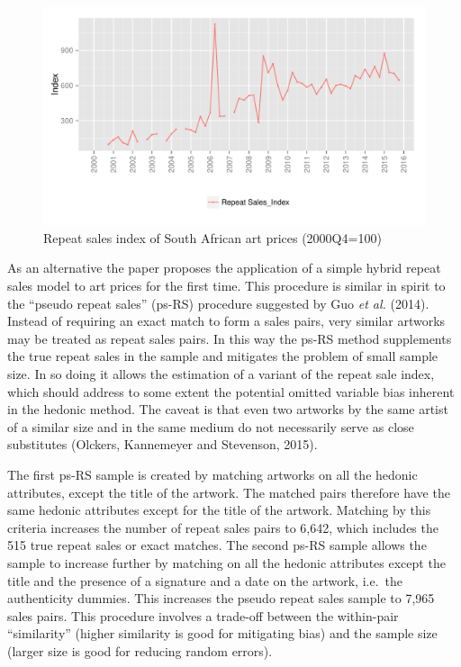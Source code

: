 \documentclass[12pt,]{article}
\begin{document}
\begin{figure}[htbp]
\centering
\includegraphics{Art_Price_Indices_3_files/figure-latex/figure8-1.pdf}
\caption{Repeat sales index of South African art prices (2000Q4=100)}
\end{figure}

As an alternative the paper proposes the application of a simple hybrid
repeat sales model to art prices for the first time. This procedure is
similar in spirit to the ``pseudo repeat sales'' (ps-RS) procedure
suggested by Guo \emph{et al.} (2014). Instead of requiring an exact
match to form a sales pairs, very similar artworks may be treated as
repeat sales pairs. In this way the ps-RS method supplements the true
repeat sales in the sample and mitigates the problem of small sample
size. In so doing it allows the estimation of a variant of the repeat
sale index, which should address to some extent the potential omitted
variable bias inherent in the hedonic method. The caveat is that even
two artworks by the same artist of a similar size and in the same medium
do not necessarily serve as close substitutes (Olckers, Kannemeyer and
Stevenson, 2015).

The first ps-RS sample is created by matching artworks on all the
hedonic attributes, except the title of the artwork. The matched pairs
therefore have the same hedonic attributes except for the title of the
artwork. Matching by this criteria increases the number of repeat sales
pairs to 6,642, which includes the 515 true repeat sales or exact
matches. The second ps-RS sample allows the sample to increase further
by matching on all the hedonic attributes except the title and the
presence of a signature and a date on the artwork, i.e.~the authenticity
dummies. This increases the pseudo repeat sales sample to 7,965 sales
pairs. This procedure involves a trade-off between the within-pair
``similarity'' (higher similarity is good for mitigating bias) and the
sample size (larger size is good for reducing random errors).
\end{document}

